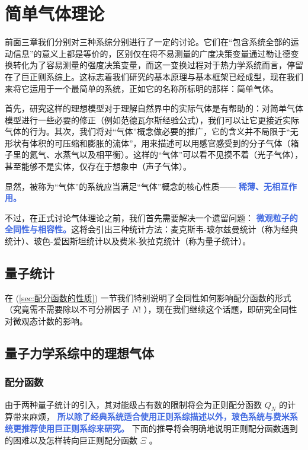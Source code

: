 \chapter{简单气体理论}\label{cha:简单气体}

前面三章我们分别对三种系综分别进行了一定的讨论。它们在“包含系统全部的运动信息”的意义上都是等价的，区别仅在将不易测量的广度决策变量通过勒让德变换转化为了容易测量的强度决策变量，而这一变换过程对于热力学系统而言，停留在了巨正则系综上。这标志着我们研究的基本原理与基本框架已经成型，现在我们来将它运用于一个最简单的系统，正如它的名称所标明的那样：简单气体。

首先，研究这样的理想模型对于理解自然界中的实际气体是有帮助的：对简单气体模型进行一些必要的修正（例如范德瓦尔斯经验公式），我们可以让它更接近实际气体的行为。其次，我们将对“气体”概念做必要的推广，它的含义并不局限于“无形状有体积的可压缩和膨胀的流体”，用来描述可以用感官感受到的分子气体（箱子里的氦气、水蒸气以及相平衡）。这样的“气体”可以看不见摸不着（光子气体），甚至能够不是实体，仅存在于想象中（声子气体）。

显然，被称为“气体”的系统应当满足“气体”概念的核心性质—— \textcolor{RoyalBlue}{\textbf{\kaishu 稀薄、无相互作用。}}

不过，在正式讨论气体理论之前，我们首先需要解决一个遗留问题： \textcolor{RoyalBlue}{\textbf{\kaishu 微观粒子的全同性与相容性。}}这将会引出三种统计方法：麦克斯韦-玻尔兹曼统计（称为经典统计）、玻色-爱因斯坦统计以及费米-狄拉克统计（称为量子统计）。

\section{量子统计}\label{sec:量子统计}

在 (\ref*{sec:配分函数的性质}) 一节我们特别说明了全同性如何影响配分函数的形式（究竟需不需要除以不可分辨因子 $N!$ ），现在我们继续这个话题，即研究全同性对微观态计数的影响。

\section{量子力学系综中的理想气体}\label{sec:量子力学系综中的理想气体}

\subsection{配分函数}
由于两种量子统计的引入，其对能级占有数的限制将会为正则配分函数 $Q_N$ 的计算带来麻烦， \textcolor{RoyalBlue}{\textbf{\kaishu 所以除了经典系统适合使用正则系综描述以外，玻色系统与费米系统更推荐使用巨正则系综来研究。}} 下面的推导将会明确地说明正则配分函数遇到的困难以及怎样转向巨正则配分函数 $\Xi$ 。

